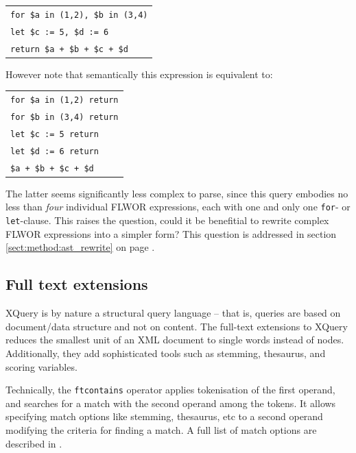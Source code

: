 \begin{center}
\begin{tabular}{l}
\texttt{for \$a in (1,2), \$b in (3,4)} \\
  \texttt{let \$c := 5, \$d := 6} \\ \quad 
  \texttt{return \$a + \$b + \$c + \$d} \\
\end{tabular}
\end{center}

However note that semantically this expression is equivalent to:

\begin{center}
\begin{tabular}{l}
\texttt{for \$a in (1,2) return} \\ \quad
  \texttt{for \$b in (3,4) return} \\ \quad \quad
    \texttt{let \$c := 5 return} \\ \quad \quad \quad 
      \texttt{let \$d := 6 return} \\ \quad \quad \quad \quad 
        \texttt{\$a + \$b + \$c + \$d} \\
\end{tabular}
\end{center}

The latter seems significantly less complex to parse, since this query embodies
no less than \emph{four} individual FLWOR expressions, each with one and only
one \texttt{for}- or \texttt{let}-clause. This raises the question, could it be
benefitial to rewrite complex FLWOR expressions into a simpler form? This
question is addressed in section \ref{sect:method:ast_rewrite} on page
\pageref{sect:method:ast_rewrite}.

\subsection{Full text extensions}
\label{sect:theory:xquery:fulltext_ext}
XQuery is by nature a structural query language -- that is, queries are based on
document/data structure and not on content. The full-text extensions to XQuery
reduces the smallest unit of an XML document to single words instead of nodes.
Additionally, they add sophisticated tools such as stemming, thesaurus, and
scoring variables.

Technically, the \verb!ftcontains! operator applies tokenisation of the first
operand, and searches for a match with the second operand among the tokens. It
allows specifying match options like stemming, thesaurus, etc to a second
operand modifying the criteria for finding a match. A full list of match
options are described in \cite{w3c01}.

